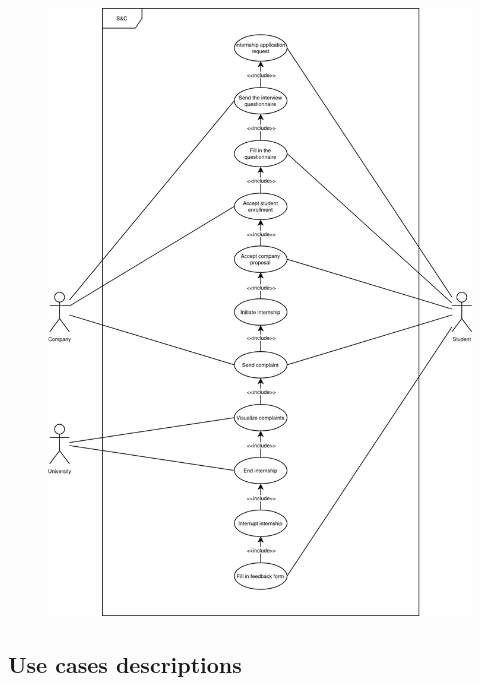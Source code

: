 \begin{figure}[H]
    \centering
    \includegraphics[width=0.8\linewidth]{../../assets/use-case-diagrams/internship-iter.png}
\end{figure}

\subsection{Use cases descriptions}

